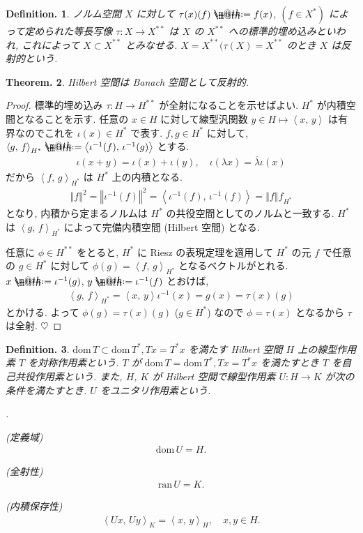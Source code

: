 \documentclass[openany, a4paper, oneside]{book}
\makeatletter
\newcounter{enum2}
\renewenvironment{enumerate}{%
\begin{list}%
{%
\arabic{enum2}.\ \,%
}%
{%
\usecounter{enum2}
\setlength{\itemindent}{0pt}%
\setlength{\leftmargin}{6pt}%
\setlength{\rightmargin}{0pt}%
\setlength{\labelsep}{0pt}%
\setlength{\labelwidth}{6pt}%
\setlength{\itemsep}{0pt}%
\setlength{\parsep}{0pt}%
\setlength{\listparindent}{0pt}%
}
}{%
\end{list}%
}
\newcommand*{\defeq}{\mathrel{\rlap{%
\raisebox{0.3ex}{$\m@th\cdot$}}%
\raisebox{-0.3ex}{$\m@th\cdot$}}%
=}
\newcommand{\dom}{\mathrm{dom}\,}
\newcommand{\ran}{\mathrm{ran}\,}
\theoremstyle{break}
\newtheorem{thm}{Theorem.}[section]
\theoremstyle{breakdefn}
\newtheorem{defn}[thm]{Definition.}
\newcommand{\norm}[1]{\left\Vert#1\right\Vert}
\newcommand{\bkt}[2]{\left\langle#1,\,#2\right\rangle}
\makeatother
\begin{document}
\begin{defn}
ノルム空間 $X$ に対して $\tau (x) (f) \defeq f (x)$, $(f\in X^*)$ によって定められた等長写像
$\tau \colon X \to X^{**}$ は $X$ の $X^{**}$ への標準的埋め込みといわれ,
これによって $X \subset X^{**}$ とみなせる.
$X = X^{**} (\tau (X) = X^{**}$ のとき $X$ は反射的という.
\end{defn}
\begin{thm}
 Hilbert 空間は Banach 空間として反射的.
\end{thm}
\begin{proof}
標準的埋め込み $\tau \colon H \to H^{**}$ が全射になることを示せばよい.
$H^*$ が内積空間となることを示す.
任意の $x \in H$ に対して線型汎関数 $y \in H \mapsto \bkt{x}{y}$ は有界なのでこれを
$\iota (x) \in H^*$ で表す.
$f, g \in H^*$ に対して, $\bkt{g}{f}_{H^*} \defeq \bkt{\iota^{-1}(f)}{\iota^{-1}(g)}$ とする.
\begin{align}
 \iota (x + y)
 =
 \iota (x) + \iota (y), \quad
 \iota (\lambda x)
 =
 \overline{\lambda} \iota (x)
\end{align}
だから $\bkt{f}{g}_{H^*}$ は $H^*$ 上の内積となる.
\begin{align}
 \norm{f}^2
 =
 \norm{\iota^{-1}(f)}^2
 =
 \bkt{\iota^{-1}(f)}{\iota^{-1}(f)}
 =
 \norm{f}{f}_{H^*}
\end{align}
となり, 内積から定まるノルムは $H^*$ の共役空間としてのノルムと一致する.
$H^*$ は $\bkt{g}{f}_{H^*}$ によって完備内積空間 (Hilbert 空間) となる.

任意に $\phi \in H^{**}$ をとると, $H^*$ に Riesz の表現定理を適用して
$H^*$ の元 $f$ で任意の $g \in H^*$ に対して $\phi (g) = \bkt{f}{g}_{H^*}$ となるベクトルがとれる.
$x \defeq \iota^{-1}(g)$, $y \defeq \iota^{-1}(f)$ とおけば,
\begin{align}
 \bkt{g}{f}_{H^*}
 =
 \bkt{x}{y} \iota^{-1}(x)
 =
 g(x)
 =
 \tau (x) (g)
\end{align}
とかける.
よって $\phi (g) = \tau (x) (g)$ ($g \in H^*$) なので $\phi = \tau (x)$ となるから $\tau$ は全射.
$\heartsuit$
\end{proof}

\begin{defn}
 $\dom T \subset \dom T^*, Tx = T^*x$ を満たす Hilbert 空間 $H$ 上の線型作用素 $T$ を対称作用素という.
 $T$ が $\dom T = \dom T^*, Tx = T^*x$ を満たすとき $T$ を自己共役作用素という.
 また, $H$, $K$ が Hilbert 空間で線型作用素 $U \colon H \to K$ が次の条件を満たすとき. $U$ をユニタリ作用素という.
\begin{enumerate}
\item \textup{(定義域)}
   \begin{align}
    \dom U = H.
   \end{align}
\item \textup{(全射性)}
   \begin{align}
    \ran U
    =
    K.
   \end{align}
\item \textup{(内積保存性)}
   \begin{align}
    \bkt{Ux}{Uy}_{K}
    =
    \bkt{x}{y}_{H}, \quad x, y \in H.
   \end{align}
\end{enumerate}
\end{defn}
\end{document}
